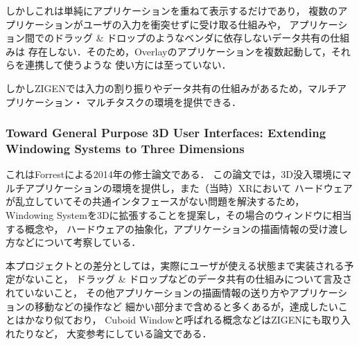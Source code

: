 しかしこれは単純にアプリケーションを重ねて表示するだけであり，
複数のアプリケーションがユーザの入力を衝突せずに受け取る仕組みや，
アプリケーション間でのドラッグ \& ドロップのようなベンダに依存しないデータ共有の仕組みは
存在しない．そのため，Overlayのアプリケーションを複数起動して，それらを連携して使うような
使い方には至っていない．

しかしZIGENでは入力の割り振りやデータ共有の仕組みがあるため，マルチアプリケーション・
マルチタスクの環境を提供できる．

\subsubsection{
  Toward General Purpose 3D User Interfaces:
  Extending Windowing Systems to Three Dimensions \cite{forrest}
}
\label{section:forrest}

これはForrestによる2014年の修士論文である．
この論文では，3D没入環境にマルチアプリケーションの環境を提供し，また（当時）XRにおいて
ハードウェアが乱立していてその共通インタフェースがない問題を解決するため，
Windowing Systemを3Dに拡張することを提案し，その場合のウィンドウに相当する概念や，
ハードウェアの抽象化，アプリケーションの描画情報の受け渡し方などについて考察している．

本プロジェクトとの差分としては，実際にユーザが使える状態まで実装される予定がないこと，
ドラッグ \& ドロップなどのデータ共有の仕組みについて言及されていないこと，
その他アプリケーションの描画情報の送り方やアプリケーションの移動などの操作など
細かい部分まで含めると多くあるが，達成したいことはかなり似ており，
Cuboid Windowと呼ばれる概念などはZIGENにも取り入れたりなど，
大変参考にしている論文である．
